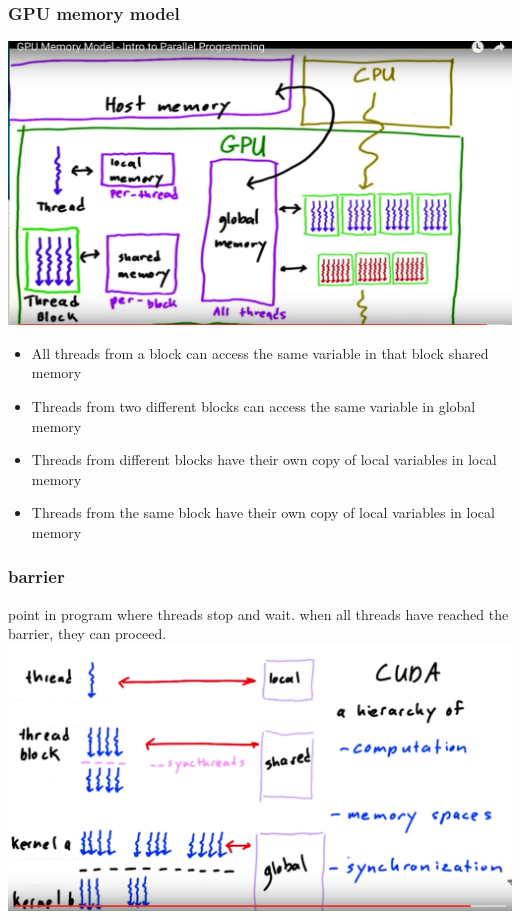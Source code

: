 \documentclass[11pt]{article}
\begin{document}
\subsubsection{GPU memory model}
\label{sec:orgheadline11}
\includegraphics[width=.9\linewidth]{./images/gpu-memory-model.png}
\begin{itemize}
\item All threads from a block can access the same variable in that
block shared memory
\item Threads from two different blocks can access the same variable in
global memory
\item Threads from different blocks have their own copy of local
variables in local memory
\item Threads from the same block have their own copy of local variables
in local memory
\end{itemize}

\subsubsection{barrier}
\label{sec:orgheadline12}
point in program where threads stop and wait. when all threads have
reached the barrier, they can proceed.
\includegraphics[width=.9\linewidth]{./images/synchronized.png}
\end{document}
